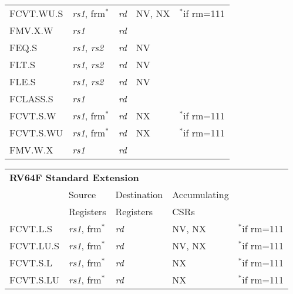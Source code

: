 \begin{tabular}{p{3cm}|p{3cm}|p{2cm}|p{4cm}|p{4cm}}
   FCVT.WU.S & {\em rs1}, frm$^*$ & {\em rd} & NV, NX & $^*$if rm=111  \\
   \cline{2-4}
   FMV.X.W & {\em rs1} & {\em rd} &   & \\
   \cline{2-4}
   FEQ.S & {\em rs1}, {\em rs2} & {\em rd} & NV &   \\
   \cline{2-4}
   FLT.S & {\em rs1}, {\em rs2} & {\em rd} & NV &   \\
   \cline{2-4}
   FLE.S & {\em rs1}, {\em rs2} & {\em rd} & NV &   \\
   \cline{2-4}
   FCLASS.S & {\em rs1} & {\em rd} &   & \\
   \cline{2-4}
   FCVT.S.W & {\em rs1}, frm$^*$ & {\em rd} & NX & $^*$if rm=111  \\
   \cline{2-4}
   FCVT.S.WU & {\em rs1}, frm$^*$ & {\em rd} & NX & $^*$if rm=111  \\
   \cline{2-4}
   FMV.W.X & {\em rs1} & {\em rd} &   & \\
   \cline{2-4}
\end{tabular}

\begin{tabular}{p{3cm}|p{3cm}|p{2cm}|p{4cm}|p{4cm}}
  \multicolumn{4}{l}{\bf RV64F Standard Extension} \\
  \cline{2-4}
   & Source    & Destination & Accumulating \\
   & Registers & Registers   & CSRs \\
  \cline{2-4}
   FCVT.L.S & {\em rs1}, frm$^*$ & {\em rd} & NV, NX & $^*$if rm=111  \\
   \cline{2-4}
   FCVT.LU.S & {\em rs1}, frm$^*$ & {\em rd} & NV, NX & $^*$if rm=111  \\
   \cline{2-4}
   FCVT.S.L & {\em rs1}, frm$^*$ & {\em rd} & NX & $^*$if rm=111  \\
   \cline{2-4}
   FCVT.S.LU & {\em rs1}, frm$^*$ & {\em rd} & NX & $^*$if rm=111   \\
   \cline{2-4}
\end{tabular}

